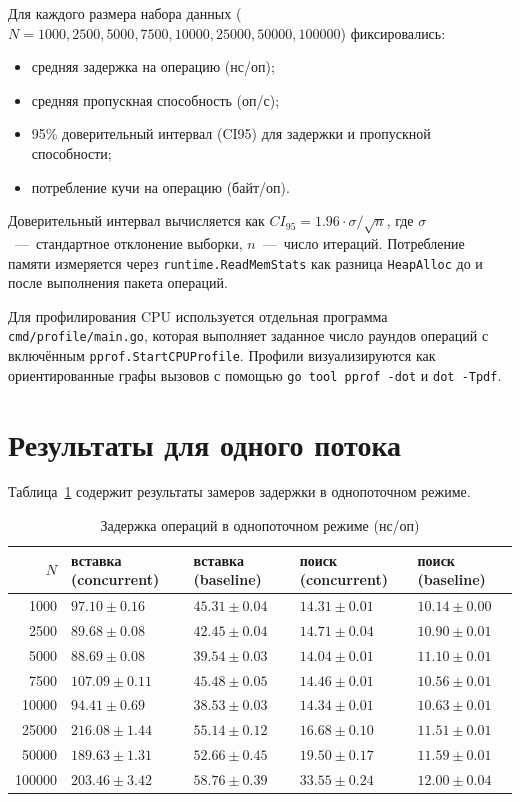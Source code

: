 \documentclass{itmo}
\begin{document}
Для каждого размера набора данных ($N = 1000, 2500, 5000, 7500, 10000, 25000, 50000, 100000$) фиксировались:
\begin{itemize}
	\item средняя задержка на операцию (нс/оп);
	\item средняя пропускная способность (оп/с);
	\item 95\% доверительный интервал (CI95) для задержки и пропускной способности;
	\item потребление кучи на операцию (байт/оп).
\end{itemize}

Доверительный интервал вычисляется как $CI_{95} = 1.96 \cdot \sigma / \sqrt{n}$, где $\sigma$~---~стандартное отклонение выборки, $n$~---~число итераций.
Потребление памяти измеряется через \texttt{runtime.ReadMemStats} как разница \texttt{HeapAlloc} до и после выполнения пакета операций.

Для профилирования CPU используется отдельная программа \texttt{cmd/profile/main.go}, которая выполняет заданное число раундов операций с включённым \texttt{pprof.StartCPUProfile}.
Профили визуализируются как ориентированные графы вызовов с помощью \texttt{go tool pprof -dot} и \texttt{dot -Tpdf}.

\section{Результаты для одного потока}

Таблица~\ref{tab:single-latency} содержит результаты замеров задержки в однопоточном режиме.

\begin{table}[H]
	\centering
	\caption{Задержка операций в однопоточном режиме (нс/оп)}
	\label{tab:single-latency}
	\begin{tabularx}{\textwidth}{|r|X|X|X|X|}
		\toprule
		$N$ & вставка (concurrent) & вставка (baseline) & поиск (concurrent) & поиск (baseline) \\
		\midrule
		1000 & $97.10 \pm 0.16$ & $45.31 \pm 0.04$ & $14.31 \pm 0.01$ & $10.14 \pm 0.00$ \\
		2500 & $89.68 \pm 0.08$ & $42.45 \pm 0.04$ & $14.71 \pm 0.04$ & $10.90 \pm 0.01$ \\
		5000 & $88.69 \pm 0.08$ & $39.54 \pm 0.03$ & $14.04 \pm 0.01$ & $11.10 \pm 0.01$ \\
		7500 & $107.09 \pm 0.11$ & $45.48 \pm 0.05$ & $14.46 \pm 0.01$ & $10.56 \pm 0.01$ \\
		10000 & $94.41 \pm 0.69$ & $38.53 \pm 0.03$ & $14.34 \pm 0.01$ & $10.63 \pm 0.01$ \\
		25000 & $216.08 \pm 1.44$ & $55.14 \pm 0.12$ & $16.68 \pm 0.10$ & $11.51 \pm 0.01$ \\
		50000 & $189.63 \pm 1.31$ & $52.66 \pm 0.45$ & $19.50 \pm 0.17$ & $11.59 \pm 0.01$ \\
		100000 & $203.46 \pm 3.42$ & $58.76 \pm 0.39$ & $33.55 \pm 0.24$ & $12.00 \pm 0.04$ \\
		\bottomrule
	\end{tabularx}
\end{table}
\end{document}
